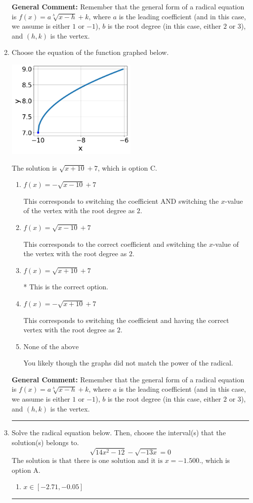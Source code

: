 \documentclass{extbook}[14pt]
\newcommand{\litem}[1]{\item #1

\rule{\textwidth}{0.4pt}}
\begin{document}
\begin{enumerate}
{\textbf{General Comment:} Remember that the general form of a radical equation is $ f(x) = a \sqrt[b]{x - h} + k$, where $a$ is the leading coefficient (and in this case, we assume is either $1$ or $-1$), $b$ is the root degree (in this case, either $2$ or $3$), and $(h, k)$ is the vertex.
}
\litem{
Choose the equation of the function graphed below.

\begin{center}
    \includegraphics[width=0.5\textwidth]{../Figures/radicalGraphToEquationCopyB.png}
\end{center}


The solution is \( \sqrt{x + 10} + 7 \), which is option C.\begin{enumerate}[label=\Alph*.]
\item \( f(x) = - \sqrt{x - 10} + 7 \)

This corresponds to switching the coefficient AND switching the $x$-value of the vertex with the root degree as $2$.
\item \( f(x) = \sqrt{x - 10} + 7 \)

This corresponds to the correct coefficient and switching the $x$-value of the vertex with the root degree as $2$.
\item \( f(x) = \sqrt{x + 10} + 7 \)

* This is the correct option.
\item \( f(x) = - \sqrt{x + 10} + 7 \)

This corresponds to switching the coefficient and having the correct vertex with the root degree as $2$.
\item \( \text{None of the above} \)

You likely though the graphs did not match the power of the radical.
\end{enumerate}

\textbf{General Comment:} Remember that the general form of a radical equation is $ f(x) = a \sqrt[b]{x - h} + k$, where $a$ is the leading coefficient (and in this case, we assume is either $1$ or $-1$), $b$ is the root degree (in this case, either $2$ or $3$), and $(h, k)$ is the vertex.
}
\litem{
Solve the radical equation below. Then, choose the interval(s) that the solution(s) belongs to.
\[ \sqrt{14 x^2 - 12} - \sqrt{-13 x} = 0 \]The solution is \( \text{that there is one solution and it is } x = -1.500. \), which is option A.\begin{enumerate}[label=\Alph*.]
\item \( x \in [-2.71,-0.05] \)


\end{enumerate}}
\end{enumerate}
\end{document}
